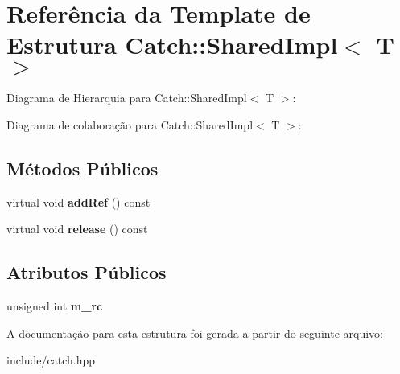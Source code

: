 \hypertarget{structCatch_1_1SharedImpl}{}\section{Referência da Template de Estrutura Catch\+:\+:Shared\+Impl$<$ T $>$}
\label{structCatch_1_1SharedImpl}


Diagrama de Hierarquia para Catch\+:\+:Shared\+Impl$<$ T $>$\+:


Diagrama de colaboração para Catch\+:\+:Shared\+Impl$<$ T $>$\+:
\subsection*{Métodos Públicos}
\begin{DoxyCompactItemize}
\item 
virtual void {\bfseries add\+Ref} () const \hypertarget{structCatch_1_1SharedImpl_a9b190b7a139a09d2624d1201d8e4f87e}{}\label{structCatch_1_1SharedImpl_a9b190b7a139a09d2624d1201d8e4f87e}

\item 
virtual void {\bfseries release} () const \hypertarget{structCatch_1_1SharedImpl_a16baad80ad5ad3dfaf2a10a157a02e01}{}\label{structCatch_1_1SharedImpl_a16baad80ad5ad3dfaf2a10a157a02e01}

\end{DoxyCompactItemize}
\subsection*{Atributos Públicos}
\begin{DoxyCompactItemize}
\item 
unsigned int {\bfseries m\+\_\+rc}\hypertarget{structCatch_1_1SharedImpl_a7e71ef1985b85aa41a1632f932a96bcb}{}\label{structCatch_1_1SharedImpl_a7e71ef1985b85aa41a1632f932a96bcb}

\end{DoxyCompactItemize}


A documentação para esta estrutura foi gerada a partir do seguinte arquivo\+:\begin{DoxyCompactItemize}
\item 
include/catch.\+hpp\end{DoxyCompactItemize}
